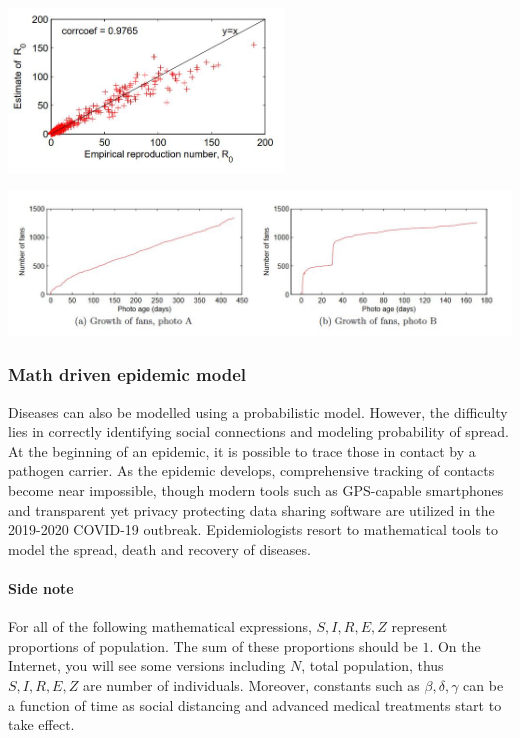 {
\centering
\includegraphics[width=0.55\textwidth]{notes/img/n3_flickr.JPG} \par
}

{
\centering
\includegraphics[width=1.0\textwidth]{notes/img/n3_flickr_2.JPG} \par
}

\subsubsection{Math driven epidemic model}

Diseases can also be modelled using a probabilistic model. However, the difficulty lies in correctly identifying social connections and modeling probability of spread. At the beginning of an epidemic, it is possible to trace those in contact by a pathogen carrier. As the epidemic develops, comprehensive tracking of contacts become near impossible, though modern tools such as GPS-capable smartphones and transparent yet privacy protecting data sharing software are utilized in the 2019-2020 COVID-19 outbreak. Epidemiologists resort to mathematical tools to model the spread, death and recovery of diseases.

\paragraph{Side note} For all of the following mathematical expressions, $S, I, R, E, Z$ represent proportions of population. The sum of these proportions should be $1$. On the Internet, you will see some versions including $N$, total population, thus $S, I, R, E, Z$ are number of individuals. Moreover, constants such as $\beta, \delta, \gamma$ can be a function of time as social distancing and advanced medical treatments start to take effect. 


